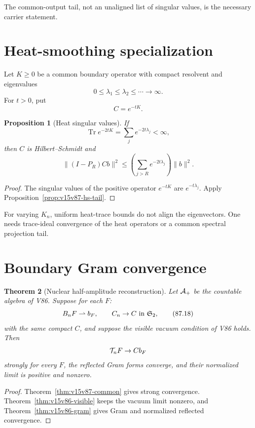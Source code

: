 \documentclass[11pt]{article}
\newtheorem{theorem}{Theorem}[section]
\newtheorem{proposition}[theorem]{Proposition}
\theoremstyle{remark}
\begin{document}
The common-output tail, not an unaligned list of singular values,
is the necessary carrier statement.

\section{Heat-smoothing specialization}

Let \(K\geq0\) be a common boundary operator with compact resolvent
and eigenvalues
\[
 0\leq\lambda_1\leq\lambda_2\leq\cdots\to\infty.
\]
For \(t>0\), put
\[
 C=e^{-tK}.                                           \tag{87.15}
\]

\begin{proposition}[Heat singular values]
\label{prop:v15v87-heat}
If
\[
 \operatorname{Tr}e^{-2tK}
 =
 \sum_je^{-2t\lambda_j}<\infty,                       \tag{87.16}
\]
then \(C\) is Hilbert--Schmidt and
\[
 \|(I-P_R)Cb\|^2
 \leq
 \left(\sum_{j>R}e^{-2t\lambda_j}\right)\|b\|^2.       \tag{87.17}
\]
\end{proposition}

\begin{proof}
The singular values of the positive operator \(e^{-tK}\) are
\(e^{-t\lambda_j}\).  Apply
Proposition~\ref{prop:v15v87-hs-tail}.
\end{proof}

For varying \(K_n\), uniform heat-trace bounds do not align the
eigenvectors.  One needs trace-ideal convergence of the heat
operators or a common spectral projection tail.

\section{Boundary Gram convergence}

\begin{theorem}[Nuclear half-amplitude reconstruction]
\label{thm:v15v87-reconstruction}
Let \({\cal A}_+\) be the countable algebra of V86.  Suppose for
each \(F\):
\[
 B_nF\rightharpoonup b_F,\qquad
 C_n\to C\ \hbox{in }{\mathfrak S}_2,                 \tag{87.18}
\]
with the same compact \(C\), and suppose the visible vacuum
condition of V86 holds.  Then
\[
 {\cal T}_nF\to Cb_F
\]
strongly for every \(F\), the reflected Gram forms converge, and
their normalized limit is positive and nonzero.
\end{theorem}

\begin{proof}
Theorem~\ref{thm:v15v87-common} gives strong convergence.
Theorem~\ref{thm:v15v86-visible} keeps the vacuum limit nonzero,
and Theorem~\ref{thm:v15v86-gram} gives Gram and normalized
reflected convergence.
\end{proof}
\end{document}
